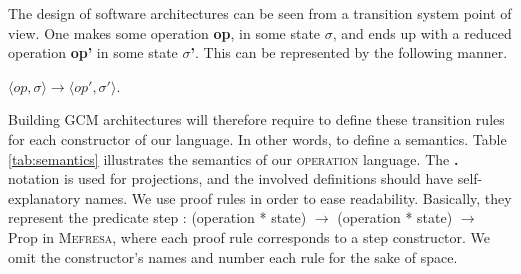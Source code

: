	
		The design of software architectures can be seen from a transition system point of view.	One makes some
	\textsf{operation} \textbf{op}, in some state \textbf{$\sigma$}, and ends up with a reduced
	\textsf{operation} \textbf{op'} in some state \textbf{$\sigma$'}. This can be represented by the following manner.
	
	\begin{center}
		$\langle op, \sigma \rangle \longrightarrow \langle op', \sigma' \rangle$. 
	\end{center}
	
	\noindent Building \ac{GCM} architectures will therefore require to define these transition rules for each
	constructor of our language. In other words, to define a semantics.	Table \ref{tab:semantics} illustrates
	the semantics of our \textsc{operation} language. The \textbf{.} notation is used for projections, and
	the involved definitions should have self-explanatory names.
	We use proof rules in order to ease readability. Basically, they represent the predicate	
	\textsf{step : (operation * state) $\rightarrow$ (operation * state) $\rightarrow$ Prop} in \textsc{Mefresa}, where
	each proof rule corresponds to a \textsf{step} constructor. We omit the constructor's names and number each
	rule for the sake of space.
	

